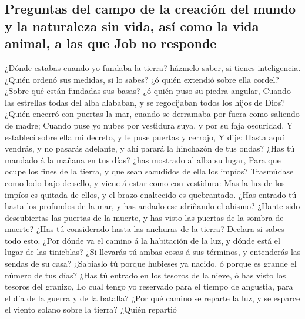 \hypertarget{preguntas-del-campo-de-la-creaciuxf3n-del-mundo-y-la-naturaleza-sin-vida-asuxed-como-la-vida-animal-a-las-que-job-no-responde}{%
\subsection{Preguntas del campo de la creación del mundo y la naturaleza
sin vida, así como la vida animal, a las que Job no
responde}\label{preguntas-del-campo-de-la-creaciuxf3n-del-mundo-y-la-naturaleza-sin-vida-asuxed-como-la-vida-animal-a-las-que-job-no-responde}}

 ¿Dónde estabas cuando yo fundaba la tierra? házmelo saber,
si tienes inteligencia.  ¿Quién ordenó sus medidas, si lo
sabes? ¿ó quién extendió sobre ella cordel?  ¿Sobre qué
están fundadas sus basas? ¿ó quién puso su piedra angular, 
Cuando las estrellas todas del alba alababan, y se regocijaban todos los
hijos de Dios?  ¿Quién encerró con puertas la mar, cuando se
derramaba por fuera como saliendo de madre;  Cuando puse yo
nubes por vestidura suya, y por su faja oscuridad.  Y
establecí sobre ella mi decreto, y le puse puertas y cerrojo,
 Y dije: Hasta aquí vendrás, y no pasarás adelante, y ahí
parará la hinchazón de tus ondas?  ¿Has tú mandado á la
mañana en tus días? ¿has mostrado al alba su lugar,  Para
que ocupe los fines de la tierra, y que sean sacudidos de ella los
impíos?  Trasmúdase como lodo bajo de sello, y viene á
estar como con vestidura:  Mas la luz de los impíos es
quitada de ellos, y el brazo enaltecido es quebrantado. 
¿Has entrado tú hasta los profundos de la mar, y has andado escudriñando
el abismo?  ¿Hante sido descubiertas las puertas de la
muerte, y has visto las puertas de la sombra de muerte? 
¿Has tú considerado hasta las anchuras de la tierra? Declara si sabes
todo esto.  ¿Por dónde va el camino á la habitación de la
luz, y dónde está el lugar de las tinieblas?  ¿Si llevarás
tú ambas cosas á sus términos, y entenderás las sendas de su casa?
 ¿Sabíaslo tú porque hubieses ya nacido, ó porque es grande
el número de tus días?  ¿Has tú entrado en los tesoros de
la nieve, ó has visto los tesoros del granizo,  Lo cual
tengo yo reservado para el tiempo de angustia, para el día de la guerra
y de la batalla?  ¿Por qué camino se reparte la luz, y se
esparce el viento solano sobre la tierra?  ¿Quién repartió
